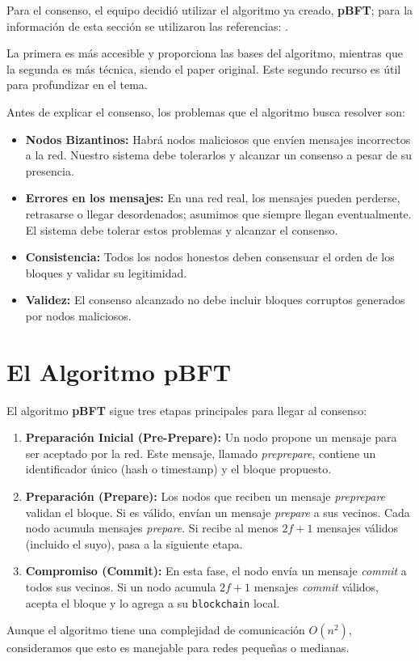 \large{
Para el consenso, el equipo decidió utilizar el algoritmo ya creado, \textbf{pBFT}; para la información de esta sección se utilizaron las referencias: \cite{geeksforgeeks_pbft} \cite{castro_liskov_1999}. 

La primera es más accesible y proporciona las bases del algoritmo, mientras que la segunda es más técnica, siendo el paper original. Este segundo recurso es útil para profundizar en el tema. 

Antes de explicar el consenso, los problemas que el algoritmo busca resolver son:
\begin{itemize}
    \item \textbf{Nodos Bizantinos:} Habrá nodos maliciosos que envíen mensajes incorrectos a la red. Nuestro sistema debe tolerarlos y alcanzar un consenso a pesar de su presencia.
    \item \textbf{Errores en los mensajes:} En una red real, los mensajes pueden perderse, retrasarse o llegar desordenados; asumimos que siempre llegan eventualmente. El sistema debe tolerar estos problemas y alcanzar el consenso.
    \item \textbf{Consistencia:} Todos los nodos honestos deben consensuar el orden de los bloques y validar su legitimidad.
    \item \textbf{Validez:} El consenso alcanzado no debe incluir bloques corruptos generados por nodos maliciosos.
\end{itemize}

}

\section*{El Algoritmo pBFT}

El algoritmo \textbf{pBFT} sigue tres etapas principales para llegar al consenso:

\begin{enumerate}
    \item \textbf{Preparación Inicial (Pre-Prepare):} 
    Un nodo propone un mensaje para ser aceptado por la red. Este mensaje, llamado \textit{preprepare}, contiene un identificador único (hash o timestamp) y el bloque propuesto.

    \item \textbf{Preparación (Prepare):} 
    Los nodos que reciben un mensaje \textit{preprepare} validan el bloque. Si es válido, envían un mensaje \textit{prepare} a sus vecinos. Cada nodo acumula mensajes \textit{prepare}. Si recibe al menos \(2f + 1\) mensajes válidos (incluido el suyo), pasa a la siguiente etapa.

    \item \textbf{Compromiso (Commit):} 
    En esta fase, el nodo envía un mensaje \textit{commit} a todos sus vecinos. Si un nodo acumula \(2f + 1\) mensajes \textit{commit} válidos, acepta el bloque y lo agrega a su \texttt{blockchain} local.
\end{enumerate}

Aunque el algoritmo tiene una complejidad de comunicación \(O(n^2)\), consideramos que esto es manejable para redes pequeñas o medianas.
